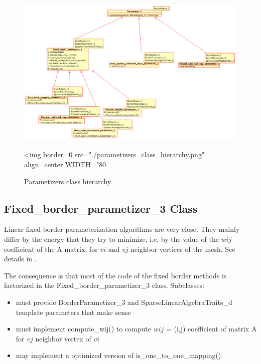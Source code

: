 \begin{figure}[bht]
    \begin{center}
        \begin{ccTexOnly}
            \includegraphics{Parameterization/parametizers_class_hierarchy}
        \end{ccTexOnly}
        \begin{ccHtmlOnly}
            <img border=0 src="./parametizers_class_hierarchy.png" align=center WIDTH="80%
        \end{ccHtmlOnly}
        \label{parameterization-fig-parametizers_class_hierarchy}

        \caption{Parametizers class hierarchy}
    \end{center}
\end{figure}


\subsection{Fixed\_border\_parametizer\_3 Class}

Linear fixed border parameterization algorithms are very close. They mainly
differ by the energy that they try to minimize, i.e. by the value of the $wij$
coefficient of the A matrix, for $vi$ and $vj$ neighbor vertices of the mesh.
See details in \cite{cgal:fh-survey-05}.

The consequence is that most of the code of the fixed border methods
is factorized in the Fixed\_border\_parametizer\_3 class.
Subclasses:
\begin{itemize}
\item must provide BorderParametizer\_3 and SparseLinearAlgebraTraits\_d template parameters that make sense
\item must implement compute\_wij() to compute $wij$ = (i,j) coefficient of matrix A for $vj$ neighbor vertex of $vi$
\item may implement a optimized version of is\_one\_to\_one\_mapping()
\end{itemize}


